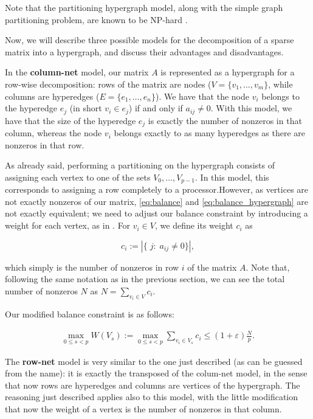 Note that the partitioning hypergraph model, along with the simple graph partitioning problem, are known to be NP-hard \cite[Ch.~6]{lengauer}. 

Now, we will describe three possible models for the decomposition of a sparse matrix into a hypergraph, and discuss their advantages and disadvantages.

In the \textbf{column-net} model, our matrix $A$ is represented as a hypergraph for a row-wise decomposition: rows of the matrix are nodes ($V=\{v_1,\dots,v_m\}$, while columns are hyperedges ($E= \{e_1,\dots,e_n\}$). We have that the node $v_i$ belongs to the hyperedge $e_j$ (in short $v_i \in e_j$) if and only if $a_{ij} \neq 0$. With this model, we have that the size of the hyperedge $e_j$ is exactly the number of nonzeros in that column, whereas the node $v_i$ belongs exactly to as many hyperedges as there are nonzeros in that row.

As already said, performing a partitioning on the hypergraph consists of assigning each vertex to one of the sets $V_0,\dots,V_{p-1}$. In this model, this corresponds to assigning a row completely to a processor.However, as vertices are not exactly nonzeros of our matrix, \eqref{eq:balance} and \eqref{eq:balance_hypergraph} are not exactly equivalent; we need to adjust our balance constraint by introducing a weight for each vertex, as in \cite[Def.~4.34]{BSP}. For $v_i \in V$, we define its weight $c_i$ as

\[
	c_i := |\{\;j : \;a_{ij} \neq 0\}|,
\]

which simply is the number of nonzeros in row $i$ of the matrix $A$. Note that, following the same notation as in the previous section, we can see the total number of nonzeros $N$ as $N = \sum_{v_i \in V} c_i$.

Our modified balance constraint is as follows:

\begin{align}
	\max_{0 \leq s <p}	W(V_s) := \max_{0 \leq s <p} \sum_{v_i \in V_s} c_i \leq (1 + \varepsilon) \frac{N}{p}.
	\label{eq:balance_columnet}
\end{align}

The \textbf{row-net} model is very similar to the one just described (as can be guessed from the name): it is exactly the transposed of the colum-net model, in the sense that now rows are hyperedges and columns are vertices of the hypergraph. The reasoning just described applies also to this model, with the little modification that now the weight of a vertex is the number of nonzeros in that column.

